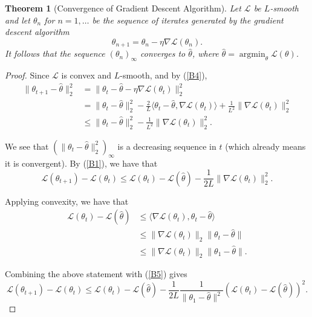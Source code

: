 \documentclass[a4paper,11pt,titlepage]{article}
\DeclareMathOperator*{\argmin}{argmin}
\theoremstyle{definition}
\theoremstyle{plain}
\newtheorem{theorem}{Theorem}[section]
\theoremstyle{remark}
\begin{document}
\begin{theorem}[Convergence of Gradient Descent Algorithm]
    Let $\mathcal{L}$ be $L$-smooth and let $\theta_n$ for $n = 1, \dots$ be the sequence of iterates generated by the gradient descent algorithm
    $$
    \theta_{n+1} = \theta_{n} - \eta \nabla \mathcal{L}(\theta_n).
    $$
    It follows that the sequence $(\theta_n)_\infty$ converges to $\hat{\theta}$, where $\hat{\theta} = \argmin_\theta \mathcal{L}(\theta)$.
\end{theorem}
\begin{proof}
    Since $\mathcal{L}$ is convex and $L$-smooth, and by (\ref{B4}),
    \begin{align*}
        \|\theta_{t+1} - \hat{\theta}\|_2^2 &= \|\theta_{t} - \hat{\theta} - \eta \nabla \mathcal{L}(\theta_t)\|_2^2 \\
        &= \|\theta_{t} - \hat{\theta}\|_2^2 - \frac{2}{L}\langle \theta_t - \hat{\theta}, \nabla \mathcal{L}(\theta_t)\rangle + \frac{1}{L^2}\|\nabla \mathcal{L}(\theta_t)\|_2^2 \\
        &\leq \| \theta_t - \hat{\theta}\|_2^2 - \frac{1}{L^2}\|\nabla \mathcal{L}(\theta_t)\|_2^2.
    \end{align*}
    
    We see that $(\|\theta_t - \hat{\theta}\|_2^2)_\infty$ is a decreasing sequence in $t$ (which already means it is convergent). By (\ref{B1}), we have that
    \begin{equation}
    \mathcal{L}(\theta_{t+1}) - \mathcal{L}(\theta_t) \leq \mathcal{L}(\theta_t) - \mathcal{L}(\hat{\theta}) - \frac{1}{2L}\|\nabla \mathcal{L}(\theta_t) \|_2^2. \label{B5}
    \end{equation}
    
    Applying convexity, we have that
    \begin{align*}
        \mathcal{L}(\theta_t) - \mathcal{L}(\hat{\theta}) &\leq \langle \nabla \mathcal{L}(\theta_t), \theta_t - \hat{\theta} \rangle \\
        &\leq \| \nabla \mathcal{L}(\theta_t)\|_2 \| \theta_t - \hat{\theta} \| \\
        &\leq \| \nabla \mathcal{L}(\theta_t)\|_2 \| \theta_1 - \hat{\theta} \|.
    \end{align*}
    
    Combining the above statement with (\ref{B5}) gives
    \begin{equation}
        \mathcal{L}(\theta_{t+1}) - \mathcal{L}(\theta_{t}) \leq \mathcal{L}(\theta_{t}) - \mathcal{L}(\hat{\theta}) - \frac{1}{2L} \frac{1}{\| \theta_1 - \hat{\theta} \|^2}\left(\mathcal{L}(\theta_t) - \mathcal{L}(\hat{\theta})\right)^2. \label{B6}
    \end{equation}
    

\end{proof}
\end{document}
